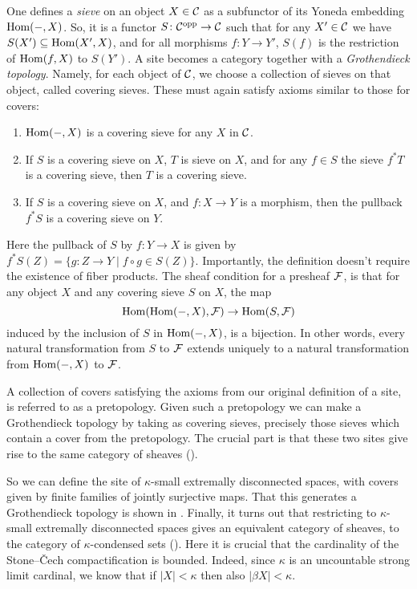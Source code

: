 \documentclass{article}
\DeclareMathOperator{\opp}{opp}
\begin{document}
One defines a \emph{sieve} on an object $X \in \mathcal{C}$ as a subfunctor
of its Yoneda embedding $\operatorname{Hom}(- ,X)$. So, it is a functor $S \colon \mcC^{\opp} \to \mcC$
such that for any $X' \in \mathcal{C}$ we have $S(X') \subseteq \operatorname{Hom}(X', X)$,
and for all morphisms $f\colon Y \to Y'$, $S(f)$ is the restriction
of $\operatorname{Hom}(f, X)$ to $S(Y')$. A site becomes a category together with
a \emph{Grothendieck topology}. Namely, for each object of $\mathcal{C}$,
we choose a collection of sieves on that object, called covering sieves.
These must again satisfy axioms similar to those for covers:
\begin{enumerate}
    \item $\operatorname{Hom}(-, X)$ is a covering sieve for any $X$ in $\mathcal{C}$.
    \item If $S$ is a covering sieve on $X$, $T$ is sieve on $X$,
          and for any $f\in S$ the sieve $f^*T$ is a covering sieve,
          then $T$ is a covering sieve.
    \item If $S$ is a covering sieve on $X$, and $f\colon X \to Y$ is
          a morphism, then the pullback $f^*S$ is a covering sieve on $Y$.
\end{enumerate}
Here the pullback of $S$ by $f\colon Y \to X$ is given by
$f^*S(Z)= \{g\colon Z \to Y \mid f\circ g \in S(Z)\}$.
Importantly, the definition doesn't require the existence of fiber products.
The sheaf condition for a presheaf $\mathcal{F}$, is that for any
object $X$ and any covering sieve $S$ on $X$, the map
\begin{equation*}
    \operatorname{Hom}(\operatorname{Hom}(-, X), \mathcal{F}) \to \operatorname{Hom}(S, \mathcal{F})
\end{equation*}
induced by the inclusion of $S$ in $\operatorname{Hom}(-, X)$, is a bijection.
In other words, every natural transformation from $S$ to $\mathcal{F}$
extends uniquely to a natural transformation from $\operatorname{Hom}(-, X)$
to $\mathcal{F}$.

A collection of covers satisfying the axioms from our original definition
of a site, is referred to as a pretopology. Given such a pretopology
we can make a Grothendieck topology by taking as covering sieves,
precisely those sieves which contain a cover from the pretopology.
The crucial part is that these two sites give rise to the same category
of sheaves (\cite[Corollary 1.1.28]{Dag2021FoundationsCM}).

So we can define the site of $\kappa$-small extremally
disconnected spaces, with covers given by finite families
of jointly surjective maps. That this generates a Grothendieck
topology is shown in \cite[Proposition 1.2.12]{Dag2021FoundationsCM}.
Finally, it turns out that restricting to $\kappa$-small extremally disconnected
spaces gives an equivalent category of sheaves, to the category
of $\kappa$-condensed sets (\cite[Theorem 1.2.16]{Dag2021FoundationsCM}).
Here it is crucial that the cardinality of the Stone--\v{C}ech compactification
is bounded. Indeed, since $\kappa$ is an uncountable strong limit cardinal,
we know that if $|X| < \kappa$ then also $|\beta X| < \kappa$.
\end{document}
